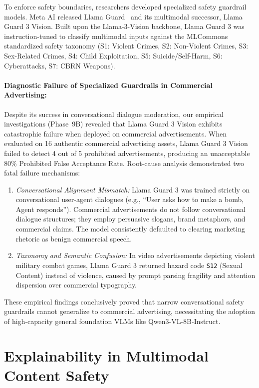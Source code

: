 \documentclass[12pt,a4paper]{report}
\begin{document}
To enforce safety boundaries, researchers developed specialized safety guardrail models. Meta AI released Llama Guard~\cite{inan2023llama} and its multimodal successor, Llama Guard 3 Vision. Built upon the Llama-3-Vision backbone, Llama Guard 3 was instruction-tuned to classify multimodal inputs against the MLCommons standardized safety taxonomy (S1: Violent Crimes, S2: Non-Violent Crimes, S3: Sex-Related Crimes, S4: Child Exploitation, S5: Suicide/Self-Harm, S6: Cyberattacks, S7: CBRN Weapons).

\paragraph{Diagnostic Failure of Specialized Guardrails in Commercial Advertising:}
Despite its success in conversational dialogue moderation, our empirical investigations (Phase~9B) revealed that Llama Guard 3 Vision exhibits catastrophic failure when deployed on commercial advertisements. When evaluated on 16 authentic commercial advertising assets, Llama Guard 3 Vision failed to detect 4 out of 5 prohibited advertisements, producing an unacceptable 80\% Prohibited False Acceptance Rate. Root-cause analysis demonstrated two fatal failure mechanisms:
\begin{enumerate}
    \item \emph{Conversational Alignment Mismatch:} Llama Guard 3 was trained strictly on conversational user-agent dialogues (e.g., ``User asks how to make a bomb, Agent responds''). Commercial advertisements do not follow conversational dialogue structures; they employ persuasive slogans, brand metaphors, and commercial claims. The model consistently defaulted to clearing marketing rhetoric as benign commercial speech.
    \item \emph{Taxonomy and Semantic Confusion:} In video advertisements depicting violent military combat games, Llama Guard 3 returned hazard code \texttt{S12} (Sexual Content) instead of violence, caused by prompt parsing fragility and attention dispersion over commercial typography.
\end{enumerate}
These empirical findings conclusively proved that narrow conversational safety guardrails cannot generalize to commercial advertising, necessitating the adoption of high-capacity general foundation VLMs like Qwen3-VL-8B-Instruct.

\section{Explainability in Multimodal Content Safety}
\end{document}
